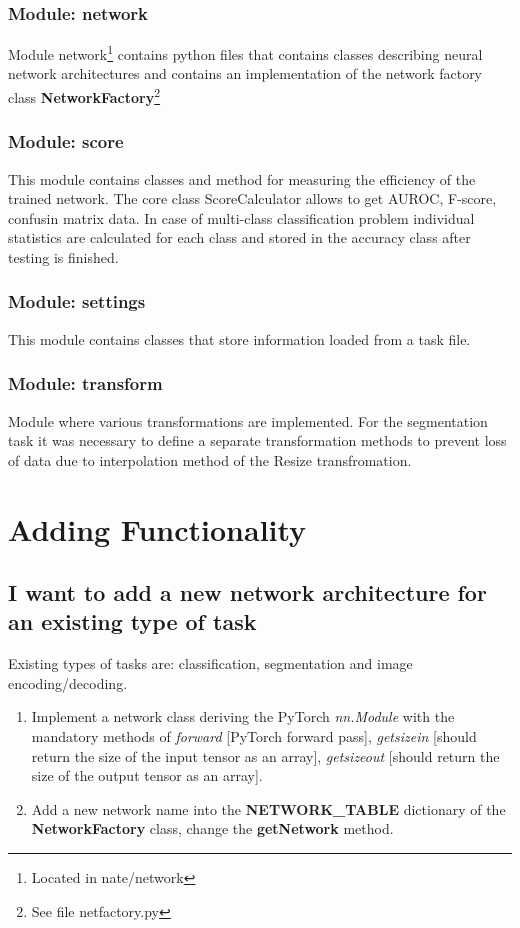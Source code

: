\documentclass[a4paper, 11pt]{article}
\begin{document}
\subsubsection{Module: network}
Module network\footnote{Located in nate/network} contains python files that contains classes describing neural network architectures and contains an implementation of the network factory class \textbf{NetworkFactory}\footnote{See file netfactory.py}
\subsubsection{Module: score}
This module contains classes and method for measuring the efficiency of the trained network. The core class ScoreCalculator allows to get AUROC, F-score, confusin matrix data. In case of multi-class classification problem individual statistics are calculated for each class and stored in the accuracy class after testing is finished. 
\subsubsection{Module: settings}
This module contains classes that store information loaded from a task file.
\subsubsection{Module: transform}
Module where various transformations are implemented. For the segmentation task it was necessary to define a separate transformation methods to prevent loss of data due to interpolation method of the Resize transfromation.

\section{Adding Functionality}

\subsection{I want to add a new network architecture for an existing type of task}
Existing types of tasks are: classification, segmentation and image encoding/decoding.

\begin{enumerate}
\item Implement a network class deriving the PyTorch \textit{nn.Module} with the mandatory methods of \textit{forward} [PyTorch forward pass], \textit{getsizein} [should return the size of the input tensor as an array], \textit{getsizeout} [should return the size of the output tensor as an array].
\item Add a new network name into the \textbf{NETWORK\_TABLE} dictionary of the \textbf{NetworkFactory} class, change the \textbf{getNetwork} method.
\end{enumerate}
\end{document}
